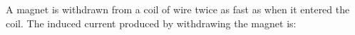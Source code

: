 A magnet is withdrawn from a coil of wire twice as fast as when it entered the coil. 
The induced current produced by withdrawing the magnet is: